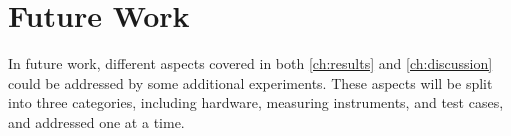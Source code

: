 \chapter{Future Work}\label{ch:future_work}

In future work, different aspects covered in both \cref{ch:results} and \cref{ch:discussion} could be addressed by some additional experiments. These aspects will be split into three categories, including hardware, measuring instruments, and test cases, and addressed one at a time.






